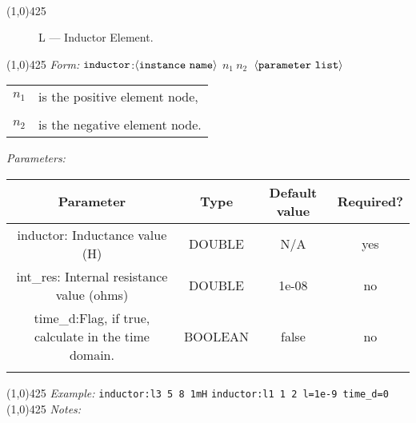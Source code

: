 \documentclass{article}
\begin{document}
\\
\hrulefill \linethickness{0.5mm}\line(1,0){425}
\normalsize
\newline
\begin{figure}[h]
\centerline{\epsfxsize=1in} \caption{L ---
Inductor Element.}
\end{figure}
\newline
\linethickness{0.5mm} \line(1,0){425}
\newline
\textit{Form:}
\newline
$\tt inductor$:$\langle \tt{instance\ name}\rangle$ $n_1\ n_2\ $
$\langle \tt{parameter\ list}\rangle$
\newline
\begin{tabular}{r l}
$n_1$ & is the positive element node, \\
&  \\
$n_2$ & is the negative element node. \\
\end{tabular}
\newline
\textit{Parameters:}
\begin{table}[H]
\begin{tabular}{|c|c|c|c|}
\hline
Parameter&Type&Default value&Required?\\
\hline
inductor: Inductance value (H)& DOUBLE & N/A & yes\\
\hline
int\_res: Internal resistance value (ohms) & DOUBLE & 1e-08 & no\\
\hline
time\_d:Flag, if true, calculate in the time domain. & BOOLEAN & false & no\\
\par
\hline
\end{tabular}
\end{table}
\noindent\linethickness{0.5mm}\line(1,0){425}
\newline
\textit{Example:}
\newline
\texttt{inductor:l3\ 5\ 8\ 1mH}
\newline
\texttt{inductor:l1\ 1\ 2\ l=1e-9 time\_d=0}
\newline
\linethickness{0.5mm} \line(1,0){425}
\newline
\textit{Notes:}\\
\end{document}
